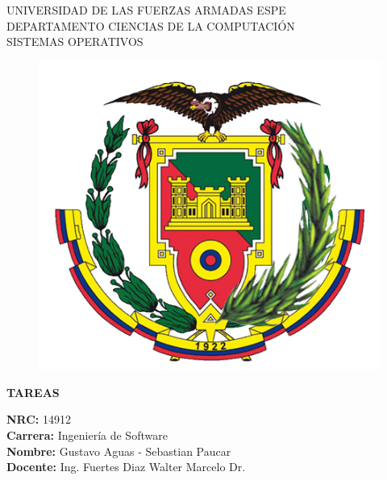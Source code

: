 \documentclass[11pt,twoside]{book}
\begin{document}
\begin{center}
    \LARGE UNIVERSIDAD DE LAS FUERZAS ARMADAS ESPE\\[0.5cm]
    \Large DEPARTAMENTO CIENCIAS DE LA COMPUTACIÓN \\[0.5cm]
    \large SISTEMAS OPERATIVOS\\[0.5cm]
    \begin{figure}[htb] \centering \includegraphics[scale=.6]{Logo_ESPE} \end{figure}
     \vspace{0.5cm}
    \large{\bf TAREAS }\\ \vspace{.25cm} 
  \end{center}
  
  \begin{flushleft}
    \Large{\bf NRC: } 14912 \textbf{}\\
    \vspace{0.5cm}
    \Large{\bf Carrera:} Ingeniería de Software\\
    \vspace{0.5cm}
    \Large{\bf Nombre: } Gustavo Aguas - Sebastian Paucar\\
    \vspace{0.5cm}
    \Large{\bf Docente: } Ing. Fuertes Diaz Walter Marcelo Dr.\\
    \vspace{0.5cm}
    \vspace{0.5cm}
  \end{flushleft}
  
\end{document}
